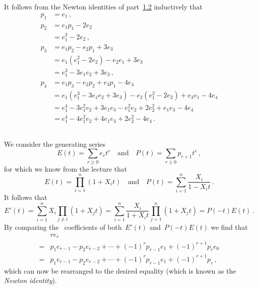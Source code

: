 \section{}





\subsection{}
It follows from the Newton identities of part~\ref*{newton identity} inductively that
\begin{align*}
      p_1
  &=  e_1 \,,
  \\
      p_2
  &=  e_1 p_1 - 2 e_2 \\
  &=  e_1^2 - 2 e_2 \,,
  \\
      p_3
  &=  e_1 p_2 - e_2 p_1 + 3 e_3 \\
  &=  e_1 ( e_1^2 - 2 e_2 ) - e_2 e_1 + 3 e_3 \\
  &=  e_1^3 - 3 e_1 e_2 + 3 e_3 \,,
  \\
      p_4
  &=  e_1 p_3 - e_2 p_2 + e_3 p_1 - 4 e_4 \\
  &=  e_1 ( e_1^3 - 3 e_1 e_2 + 3 e_3) - e_2 ( e_1^2 - 2 e_2 ) + e_3 e_1 - 4 e_4  \\
  &=  e_1^4 - 3 e_1^2 e_2 + 3 e_1 e_3 - e_1^2 e_2 + 2 e_2^2 + e_1 e_3 - 4 e_4 \\
  &=  e_1^4 - 4 e_1^2 e_2 + 4 e_1 e_3 + 2 e_2^2 - 4 e_4 \,.
\end{align*}





\subsection{}
\label{newton identity}

We consider the generating series
\[
    E(t)
  = \sum_{r \geq 0} e_r t^r
  \quad\text{and}\quad
    P(t)
  = \sum_{r \geq 0} p_{r+1} t^r \,,
\]
for which we know from the lecture that
\[
    E(t)
  = \prod_{i=1}^n (1 + X_i t)
  \quad\text{and}\quad
    P(t)
  = \sum_{i=1}^n \frac{X_i}{1 - X_i t} \,.
\]
It follows that
\[
    E'(t)
  = \sum_{i=1}^n X_i \prod_{j \neq i} (1 + X_j t)
  = \sum_{i=1}^n \frac{X_i}{1 + X_i t} \prod_{j=1}^n (1 + X_j t)
  = P(-t) E(t) \,.
\]
By comparing the~ coefficients of both~$E'(t)$ and~$P(-t)E(t)$ we find that
\begin{align*}
   {}&  r e_r \\
  ={}&  p_1 e_{r-1} - p_2 e_{r-2} + \dotsb + (-1)^r p_{r-1} e_1 + (-1)^{r+1} p_r e_0  \\
  ={}&  p_1 e_{r-1} - p_2 e_{r-2} + \dotsb + (-1)^r p_{r-1} e_1 + (-1)^{r+1} p_r  \,,
\end{align*}
which can now be rearranged to the desired equality (which is known as the \emph{Newton identity}).





